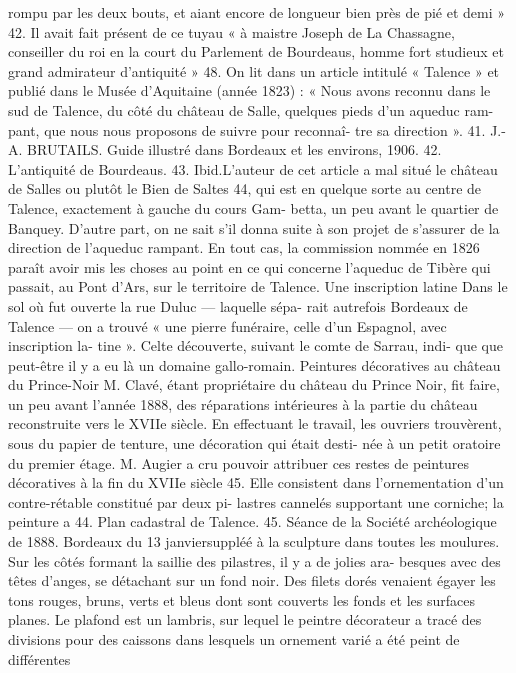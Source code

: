 \documentclass[a4paper,11pt]{book}
\begin{document}
rompu par les deux bouts, et aiant encore de longueur
bien près de pié et demi » 42. Il avait fait présent de
ce tuyau « à maistre Joseph de La Chassagne, conseiller
du roi en la court du Parlement de Bourdeaus, homme
fort studieux et grand admirateur d'antiquité » 48.
On lit dans un article intitulé « Talence » et publié dans
le Musée d'Aquitaine (année 1823) :
« Nous avons reconnu dans le sud de Talence, du côté
du château de Salle, quelques pieds d'un aqueduc ram-
pant, que nous nous proposons de suivre pour reconnaî-
tre sa direction ».
41. J.-A. BRUTAILS. Guide illustré dans Bordeaux et les environs, 1906.
42. L'antiquité de Bourdeaus.
43. Ibid.L'auteur de cet article a mal situé le château de Salles
ou plutôt le Bien de Saltes 44, qui est en quelque sorte
au centre de Talence, exactement à gauche du cours Gam-
betta, un peu avant le quartier de Banquey.
D'autre part, on ne sait s'il donna suite à son projet
de s'assurer de la direction de l'aqueduc rampant. En tout
cas, la commission nommée en 1826 paraît avoir mis les
choses au point en ce qui concerne l'aqueduc de Tibère
qui passait, au Pont d'Ars, sur le territoire de Talence.
Une inscription latine
Dans le sol où fut ouverte la rue Duluc — laquelle sépa-
rait autrefois Bordeaux de Talence — on a trouvé « une
pierre funéraire, celle d'un Espagnol, avec inscription la-
tine ». Celte découverte, suivant le comte de Sarrau, indi-
que que peut-être il y a eu là un domaine gallo-romain.
Peintures décoratives au château du Prince-Noir
M. Clavé, étant propriétaire du château du Prince Noir,
fit faire, un peu avant l'année 1888, des réparations
intérieures à la partie du château reconstruite vers le XVIIe
siècle. En effectuant le travail, les ouvriers trouvèrent,
sous du papier de tenture, une décoration qui était desti-
née à un petit oratoire du premier étage.
M. Augier a cru pouvoir attribuer ces restes de peintures
décoratives à la fin du XVIIe siècle 45. Elle consistent dans
l'ornementation d'un contre-rétable constitué par deux pi-
lastres cannelés supportant une corniche; la peinture a
44. Plan cadastral de Talence.
45. Séance de la Société archéologique de
1888.
Bordeaux du 13 janviersuppléé à la sculpture dans toutes les moulures. Sur les
côtés formant la saillie des pilastres, il y a de jolies ara-
besques avec des têtes d'anges, se détachant sur un fond
noir. Des filets dorés venaient égayer les tons rouges,
bruns, verts et bleus dont sont couverts les fonds et les
surfaces planes. Le plafond est un lambris, sur lequel le
peintre décorateur a tracé des divisions pour des caissons
dans lesquels un ornement varié a été peint de différentes
\end{document}
